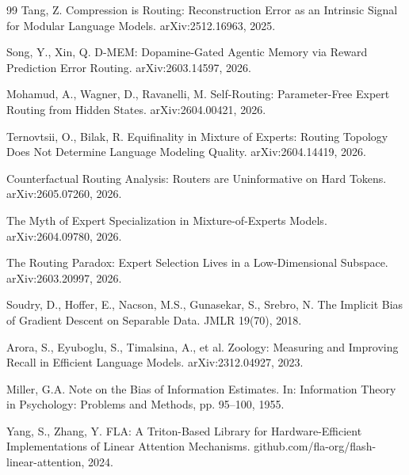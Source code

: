 \documentclass[11pt,a4paper]{article}
\begin{document}
\begin{thebibliography}{99}
 Tang, Z. Compression is Routing: Reconstruction Error as
an Intrinsic Signal for Modular Language Models. arXiv:2512.16963, 2025.

 Song, Y., Xin, Q. D-MEM: Dopamine-Gated Agentic Memory
via Reward Prediction Error Routing. arXiv:2603.14597, 2026.

 Mohamud, A., Wagner, D., Ravanelli, M.
Self-Routing: Parameter-Free Expert Routing from Hidden States.
arXiv:2604.00421, 2026.

 Ternovtsii, O.,
Bilak, R. Equifinality in Mixture of Experts: Routing Topology Does Not
Determine Language Modeling Quality. arXiv:2604.14419, 2026.

 Counterfactual Routing Analysis: Routers
are Uninformative on Hard Tokens. arXiv:2605.07260, 2026.

 The Myth of Expert Specialization in
Mixture-of-Experts Models. arXiv:2604.09780, 2026.

 The Routing Paradox: Expert Selection Lives
in a Low-Dimensional Subspace. arXiv:2603.20997, 2026.

 Soudry, D., Hoffer, E.,
Nacson, M.S., Gunasekar, S., Srebro, N. The Implicit Bias of Gradient
Descent on Separable Data. JMLR 19(70), 2018.

 Arora, S., Eyuboglu, S.,
Timalsina, A., et al. Zoology: Measuring and Improving Recall in
Efficient Language Models. arXiv:2312.04927, 2023.

 Miller, G.A. Note on the Bias of Information
Estimates. In: Information Theory in Psychology: Problems and Methods,
pp. 95--100, 1955.

 Yang, S., Zhang, Y. FLA: A Triton-Based Library for
Hardware-Efficient Implementations of Linear Attention Mechanisms.
github.com/fla-org/flash-linear-attention, 2024.

\end{thebibliography}
\end{document}

